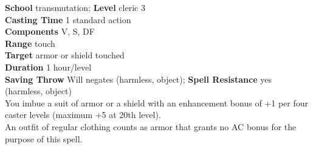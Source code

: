 \textbf{School} transmutation; \textbf{Level} cleric 3\\
\textbf{Casting Time} 1 standard action\\
\textbf{Components} V, S, DF\\
\textbf{Range} touch\\
\textbf{Target} armor or shield touched\\
\textbf{Duration} 1 hour/level\\
\textbf{Saving Throw }Will negates (harmless, object); \textbf{Spell Resistance} yes (harmless, object)\\
You imbue a suit of armor or a shield with an enhancement bonus of +1 per four caster levels (maximum +5 at 20th level).\\
An outfit of regular clothing counts as armor that grants no AC bonus for the purpose of this spell.\\
